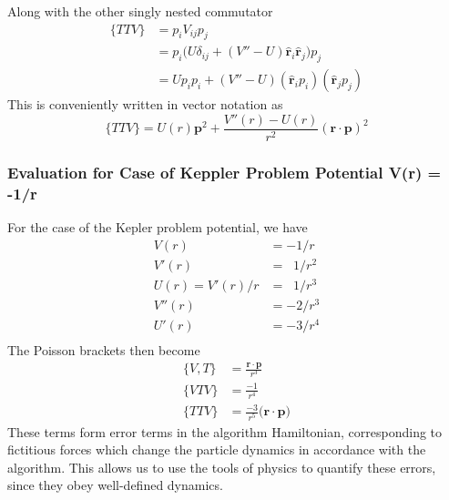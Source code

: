 \documentclass[8pt,a4paper]{article}
\begin{document}
	Along with the other singly nested commutator
	\begin{align}
		\{TTV\} &= p_i V_{ij} p_j \\
		&= p_i \Big(U\delta_{ij} +(V'' -U) \mathbf{\hat{r}}_i \mathbf{\hat{r}}_j\Big) p_j \\
		&= U p_i p_i + (V'' - U)(\mathbf{\hat{r}}_i p_i) (\mathbf{\hat{r}}_j p_j)
	\end{align}
	This is conveniently written in vector notation as
	\begin{equation}
		\boxed{ \{TTV\} = U(r) \mathbf{p}^2 + \frac{V''(r) - U(r)}{r^2} (\mathbf{r}\cdot\mathbf{p})^2 }
	\end{equation}
	
	\subsubsection{Evaluation for Case of Keppler Problem Potential V(r) = -1/r}
	For the case of the Kepler problem potential, we have
	\begin{align*}
		V(r)   &= -1/r \\
		V'(r)  &= \;\;1/r^2 \\
		U(r) = V'(r)/r &= \;\;1/r^3 \\
		V''(r) &= -2/r^3 \\
		U'(r) &= -3/r^4 \\
	\end{align*}
	The Poisson brackets then become
	\begin{align}
		\{V,T\} &= \frac{\mathbf{r}\cdot \mathbf{p}}{r^3} \\
		\{VTV\} &= \frac{-1}{r^4} \\
		\{TTV\} &= \frac{-3}{r^5}\big(\mathbf{r} \cdot \mathbf{p}\big)
	\end{align}
	These terms form error terms in the algorithm Hamiltonian, corresponding to fictitious forces which change the particle dynamics in accordance with the algorithm. This allows us to use the tools of physics to quantify these errors, since they obey well-defined dynamics.
	
	
\end{document}
